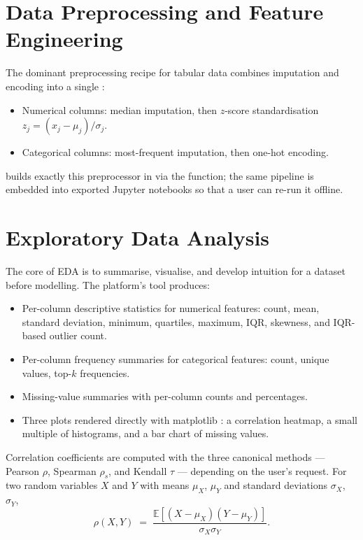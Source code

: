 \section{Data Preprocessing and Feature Engineering}
\label{sec:preproc-bg}

The dominant preprocessing recipe for tabular data
\citep{hastie2009elements, kuhn2019featureengineering} combines
imputation and encoding into a single 
\citep{sklearn2011}:
\begin{itemize}[leftmargin=1.3em]
  \item Numerical columns: median imputation, then $z$-score
        standardisation
        $z_j = (x_j - \mu_j)/\sigma_j$.
  \item Categorical columns: most-frequent imputation, then one-hot
        encoding.
\end{itemize}
\projname{} builds exactly this preprocessor in
 via the 
function; the same pipeline is embedded into exported Jupyter
notebooks so that a user can re-run it offline.

\section{Exploratory Data Analysis}
\label{sec:eda-bg}

The core of EDA \citep{tukey1977eda} is to summarise, visualise, and
develop intuition for a dataset before modelling. The platform's
 tool produces:

\begin{itemize}[leftmargin=1.3em]
  \item Per-column descriptive statistics for numerical features:
        count, mean, standard deviation, minimum, quartiles, maximum,
        IQR, skewness, and IQR-based outlier count.
  \item Per-column frequency summaries for categorical features:
        count, unique values, top-$k$ frequencies.
  \item Missing-value summaries with per-column counts and
        percentages.
  \item Three plots rendered directly with matplotlib
        \citep{hunter2007matplotlib}: a correlation heatmap, a small
        multiple of histograms, and a bar chart of missing values.
\end{itemize}

Correlation coefficients are computed with the three canonical methods
--- Pearson $\rho$, Spearman $\rho_s$, and Kendall $\tau$ ---
depending on the user's request. For two random variables $X$ and $Y$
with means $\mu_X$, $\mu_Y$ and standard deviations $\sigma_X$,
$\sigma_Y$,
\begin{equation}
  \rho(X, Y) \;=\;
  \frac{\mathbb{E}[(X-\mu_X)(Y-\mu_Y)]}{\sigma_X \sigma_Y}.
  \label{eq:pearson}
\end{equation}

